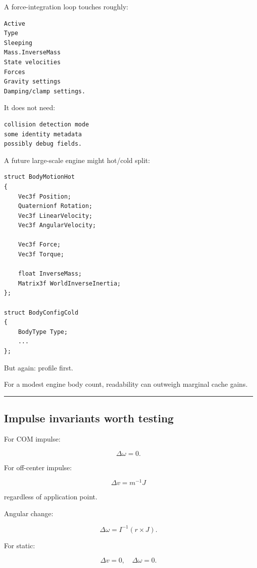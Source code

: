 A force-integration loop touches roughly:

\begin{verbatim}
Active
Type
Sleeping
Mass.InverseMass
State velocities
Forces
Gravity settings
Damping/clamp settings.
\end{verbatim}

It does not need:

\begin{verbatim}
collision detection mode
some identity metadata
possibly debug fields.
\end{verbatim}

A future large-scale engine might hot/cold split:

\begin{verbatim}
struct BodyMotionHot
{
    Vec3f Position;
    Quaternionf Rotation;
    Vec3f LinearVelocity;
    Vec3f AngularVelocity;

    Vec3f Force;
    Vec3f Torque;

    float InverseMass;
    Matrix3f WorldInverseInertia;
};

struct BodyConfigCold
{
    BodyType Type;
    ...
};
\end{verbatim}

But again: profile first.

For a modest engine body count, readability can outweigh marginal cache gains.

\begin{center}\rule{0.5\linewidth}{0.5pt}\end{center}

\subsection{Impulse invariants worth testing}\label{06-engine-ii-ch038-impulse-invariants-worth-testing}

\hypertarget{06-engine-ii-ch038-impulse-invariants-worth-testing}{}

For COM impulse:

\[
\Delta\omega=0.
\]

For off-center impulse:

\[
\Delta v=m^{-1}J
\]

regardless of application point.

Angular change:

\[
\Delta\omega
=
I^{-1}(r\times J).
\]

For static:

\[
\Delta v=0,
\quad
\Delta\omega=0.
\]

